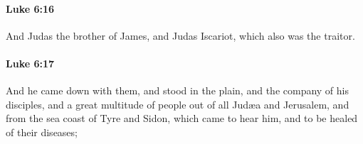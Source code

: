 		\paragraph{Luke 6:16} %
			\label{LUKE-6-16}

			And Judas the brother of James, and Judas Iscariot, which also was the traitor.

			\begin{framed}
			\scriptsize
				\begin{compactdesc}
					\item[SBLG] 
				\end{compactdesc}
			\end{framed}

		\paragraph{Luke 6:17} %
			\label{LUKE-6-17}

			And he came down with them, and stood in the plain, and the company of his disciples, and a great multitude of people out of all Judæa and Jerusalem, and from the sea coast of Tyre and Sidon, which came to hear him, and to be healed of their diseases;

